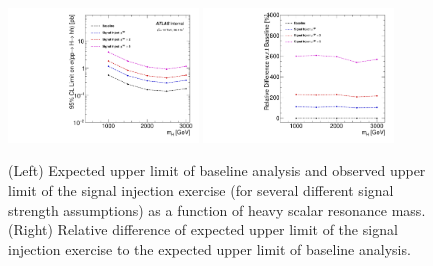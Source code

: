 \begin{figure}[!h]
\begin{center}
\includegraphics*[width=0.45\textwidth]{./figures/boosted/ABCD_SignalInjection/Limits_7000XXXXvs2000XXXX_obs}
\includegraphics*[width=0.45\textwidth]{./figures/boosted/ABCD_SignalInjection/Limits_ratio_7000XXXXvs2000XXXX_obs}
\caption{(Left) Expected upper limit of baseline analysis and observed upper limit of the signal injection exercise 
(for several different signal strength assumptions) as a function of heavy scalar resonance mass. (Right) Relative difference 
of expected upper limit of the signal injection exercise to the expected upper limit of baseline analysis.}
\label{fit:boosted_qcd_signalinject}
\end{center}
\end{figure}
\FloatBarrier


